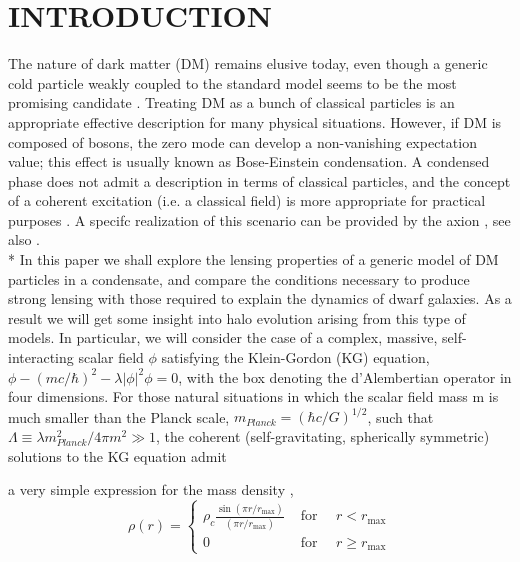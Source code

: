 \documentclass[9.5pt, twocolumn]{article}
\begin{document}
\section[I]{\centering INTRODUCTION}
The nature of dark matter (DM) remains elusive today,
even though a generic cold particle weakly coupled to the
standard model seems to be the most promising candidate
\cite{Bertone_2005}. Treating DM as a bunch of classical particles is
an appropriate effective description for many physical situations. However, if DM is composed of bosons, the zero
mode can develop a non-vanishing expectation value; this
effect is usually known as Bose-Einstein condensation. A
condensed phase does not admit a description in terms
of classical particles, and the concept of a coherent excitation
(i.e. a classical field) is more appropriate for practical
purposes \cite{Matos_2001}. A specifc realization of this scenario
can be provided by the axion \cite{Sikivie_2009}, see also \cite{B_hm_2004}.\\*
In this paper we shall explore the lensing properties
of a generic model of DM particles in a condensate, and
compare the conditions necessary to produce strong lensing
with those required to explain the dynamics of dwarf
galaxies. As a result we will get some insight into halo
evolution arising from this type of models.
In particular, we will consider the case of a complex,
massive, self-interacting scalar field $\phi$ satisfying
the Klein-Gordon (KG) equation, $\phi-(mc/\hbar)^2-\lambda|\phi|^2\phi=0$, with the box denoting the d'Alembertian
operator in four dimensions. For those natural situations
in which the scalar field mass m is much smaller
than the Planck scale, $m_{Planck}=(\hbar c/G)^{1/2}$, such that $\Lambda\equiv\lambda m^{2}_{Planck}/4\pi m^2\gg 1$, the coherent (self-gravitating,
spherically symmetric) solutions to the KG equation admit

a very simple expression for the mass density \cite{Lee_1996},\cite{Arbey_2003}
\begin{equation}
\rho(r)=\left\{\begin{array}{ccc}
\rho_{c} \frac{\sin \left(\pi r / r_{\max }\right)}{\left(\pi r / r_{\max }\right)} & \text { for } \quad r<r_{\max } \\
0 & \text { for } \quad r \geq r_{\max }
\end{array}\right.
\label{eqn:eq1}
\end{equation}
\end{document}
